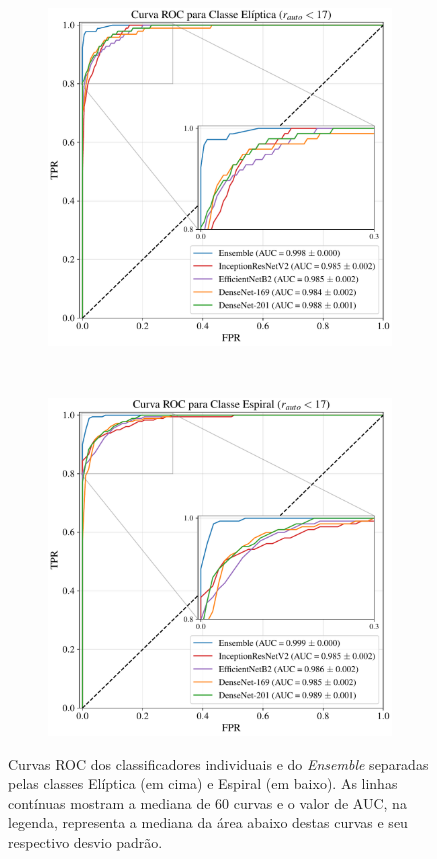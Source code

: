 \begin{figure}[!ht]%
  \centering
  \begin{subfigure}{.61\linewidth}%
    \includegraphics[width=\linewidth]{figures/roc_mn170_E.pdf}
  \end{subfigure}\\[4pt]
  \begin{subfigure}{.61\linewidth}%
    \includegraphics[width=\linewidth]{figures/roc_mn170_S.pdf}
  \end{subfigure}%
  \caption{Curvas ROC dos classificadores individuais e do \emph{Ensemble} separadas pelas classes Elíptica (em cima) e Espiral (em baixo). As linhas contínuas mostram a mediana de 60 curvas e o valor de AUC, na legenda, representa a mediana da área abaixo destas curvas e seu respectivo desvio padrão.}%
  \label{fig:roc}
\end{figure}

